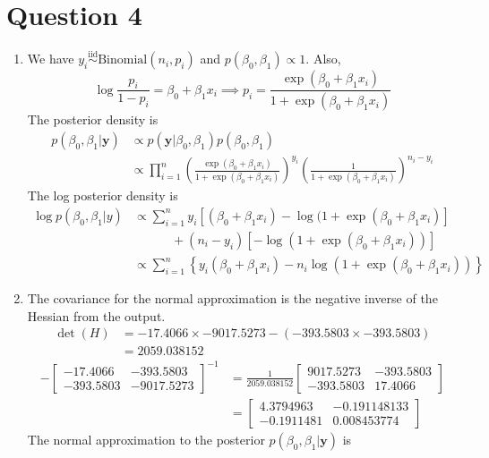 \documentclass[a4paper,12pt]{article}\usepackage[]{graphicx}\usepackage[]{color}
\newcommand{\by}{\mathbf{y}}
\newcommand{\Binomial}{\mathrm{Binomial}}
\begin{document}
\section*{Question 4}
\begin{enumerate}[label=(\alph*)]
\item We have $y_i\stackrel{\mathrm{iid}}{\sim} \Binomial(n_i,p_i)$ and $p(\beta_0,\beta_1)\propto 1$. Also,
$$\log\frac{p_i}{1-p_i}=\beta_0+\beta_1x_i \implies
p_i = \frac{\exp(\beta_0+\beta_1x_i)}{1+\exp(\beta_0+\beta_1x_i)}$$
The posterior density is
\begin{align*}
p(\beta_0,\beta_1|\by)&\propto p(\by|\beta_0,\beta_1)p(\beta_0,\beta_1) \\
&\propto \prod_{i=1}^n\left(\frac{\exp(\beta_0+\beta_1x_i)}{1+\exp(\beta_0+\beta_1x_i)}\right)^{y_i}\left(\frac{1}{1+\exp(\beta_0+\beta_1x_i)}\right)^{n_i-y_i}
\end{align*}
The log posterior density is
\begin{align*}
\log p(\beta_0,\beta_1|y) &\propto \sum_{i=1}^ny_i\left[(\beta_0+\beta_1x_i)-\log(1+\exp(\beta_0+\beta_1x_i)\right]\\
&\qquad\quad+(n_i-y_i)\left[-\log(1+\exp(\beta_0+\beta_1x_i))\right] \\
&\propto \sum_{i=1}^n\left\{y_i(\beta_0+\beta_1x_i)-n_i\log(1+\exp(\beta_0+\beta_1x_i))\right\}
\end{align*}
\item The covariance for the normal approximation is the negative inverse of the Hessian from the output.
\begin{align*}
\det(H)&=-17.4066\times-9017.5273 -(-393.5803\times -393.5803) \\
&= 2059.038152
\end{align*}
\begin{align*}
-\begin{bmatrix}
-17.4066 & -393.5803 \\
-393.5803 & -9017.5273
\end{bmatrix}^{-1}&=\frac{1}{2059.038152}
\begin{bmatrix}
9017.5273 & -393.5803 \\
-393.5803 & 17.4066
\end{bmatrix} \\
&= \begin{bmatrix}
4.3794963 & -0.191148133 \\
-0.1911481 & 0.008453774
\end{bmatrix}
\end{align*}
The normal approximation to the posterior $p(\beta_0,\beta_1|\by)$ is

\end{enumerate}
\end{document}
